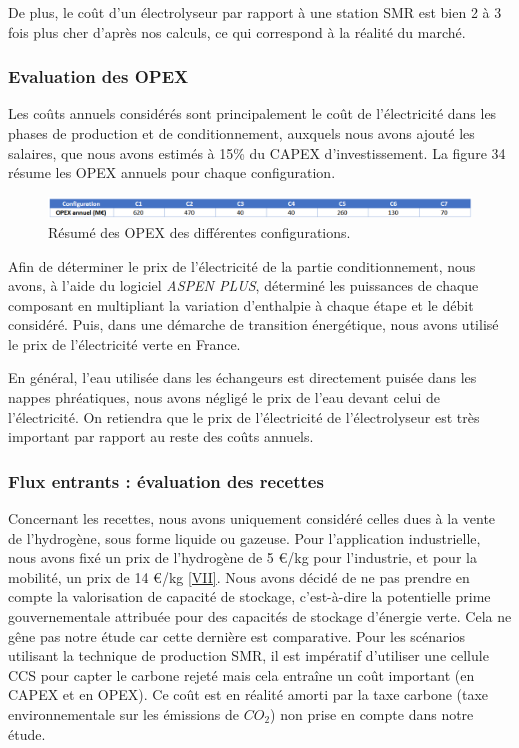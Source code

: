 \documentclass[11pt,french,a4paper]{article}
\begin{document}
De plus, le coût d’un électrolyseur par rapport à une station SMR est bien 2 à 3 fois plus cher d’après nos calculs, ce qui correspond à la réalité du marché.


\subsubsection{Evaluation des OPEX}

Les coûts annuels considérés sont principalement le coût de l’électricité dans les phases de production et de conditionnement, auxquels nous avons ajouté les salaires, que nous avons estimés à 15\% du CAPEX d’investissement. La figure 34 résume les OPEX annuels pour chaque configuration.


\begin{figure}[h!]
\centering
\includegraphics[width=0.9\linewidth]{image/chap5/Tableau 3 chap 5.png}
\caption{Résumé des OPEX des différentes configurations. }
\end{figure}

Afin de déterminer le prix de l’électricité de la partie conditionnement, nous avons, à l’aide du logiciel \emph{ASPEN PLUS}, déterminé les puissances de chaque composant en multipliant la variation d’enthalpie à chaque étape et le débit considéré. Puis, dans une démarche de transition énergétique, nous avons utilisé le prix de l’électricité verte en France.

En général, l’eau utilisée dans les échangeurs est directement puisée dans les nappes phréatiques, nous avons négligé le prix de l’eau devant celui de l’électricité. On retiendra que le prix de l’électricité de l’électrolyseur est très important par rapport au reste des coûts annuels.  

\subsubsection{Flux entrants : évaluation des recettes}
Concernant les recettes, nous avons uniquement considéré celles dues à la vente de l’hydrogène, sous forme liquide ou gazeuse. Pour l’application industrielle, nous avons fixé un prix de l'hydrogène de 5 €/kg pour l'industrie, et pour la mobilité, un prix de 14 €/kg \hyperref[sec:presRef]{[VII]}.
Nous avons décidé de ne pas prendre en compte la valorisation de capacité de stockage, c’est-à-dire la potentielle prime gouvernementale attribuée pour des capacités de stockage d’énergie verte. Cela ne gêne pas notre étude car cette dernière est comparative.
Pour les scénarios utilisant la technique de production SMR, il est impératif d’utiliser une cellule CCS pour capter le carbone rejeté mais cela entraîne un coût important (en CAPEX et en OPEX). Ce coût est en réalité amorti par la taxe carbone (taxe environnementale sur les émissions de $CO_2$) non prise en compte dans notre étude.
\end{document}
